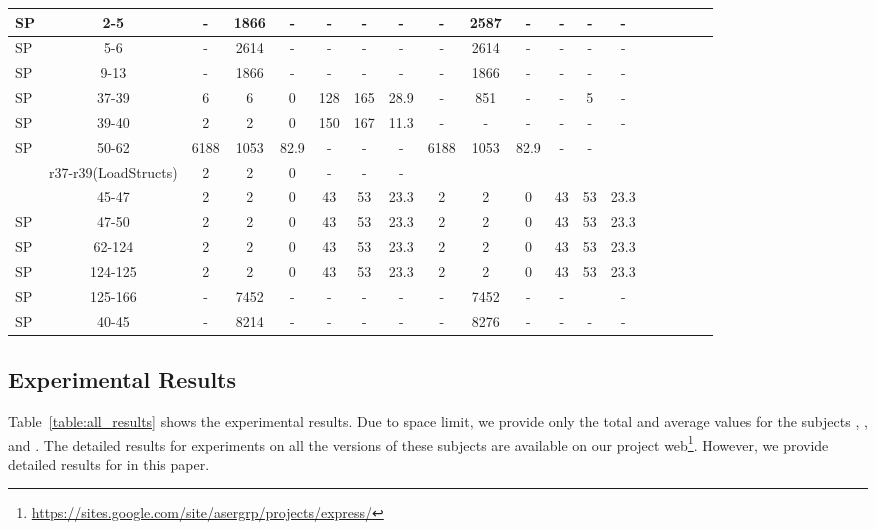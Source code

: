 \begin{table*}
\begin{CodeOut}
\begin{center}
\begin {tabular} {|l|c|c|c|c|c|c|c|c|c|c|c|c|c|c|c|c|c|c|}
\hline
SP&2-5&-&1866&-&-&-&-&-&2587&-&-&-&-\\
\hline
SP&5-6&-&2614&-&-&-&-&-&2614&-&-&-&-\\
\hline
SP&9-13&-&1866&-&-&-&-&-&1866&-&-&-&-\\
\hline
SP&37-39&6&6&0&128&165&28.9&-&851&-&-&5&-\\
\hline
SP&39-40&2&2&0&150&167&11.3&-&-&-&-&-&-\\
\hline
SP&50-62&6188&1053&82.9&-&-&-&6188&1053&82.9&-&-&\\
\hline
\Comment{SP&r37-r39(LoadStructs)&2&2&0&-&-&-&&&&&&\\
\hline}
SP&45-47&2&2&0&43&53&23.3&2&2&0&43&53&23.3\\
\hline
SP&47-50&2&2&0&43&53&23.3&2&2&0&43&53&23.3\\
\hline
SP&62-124&2&2&0&43&53&23.3&2&2&0&43&53&23.3\\
\hline
SP&124-125&2&2&0&43&53&23.3&2&2&0&43&53&23.3\\
\hline
SP&125-166&-&7452&-&-&-&-&-&7452&-&-&&-\\
\hline
SP&40-45&-&8214&-&-&-&-&-&8276&-&-&-&-\\
\hline
\end{tabular}
\end{center}
\end{CodeOut}
\vspace{- 0.35 in}
\end{table*}


\subsection{Experimental Results}
Table~\ref{table:all_results} shows the experimental results. Due to space limit, we provide only  the total and average values for the subjects , , and . The detailed results for experiments on all the versions of these subjects are available on our project web\footnote{\url{https://sites.google.com/site/asergrp/projects/express/}}.
However, we provide detailed results for  in this paper. 

